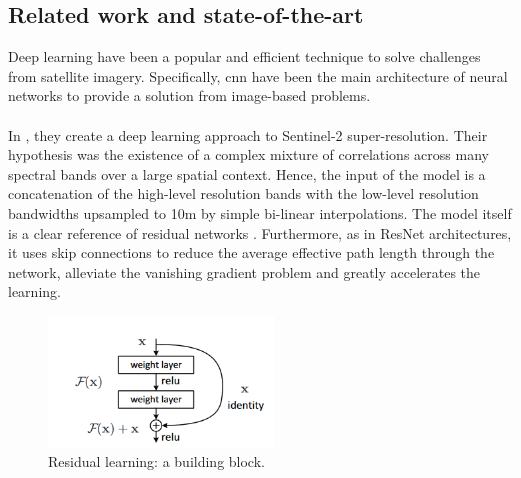 \documentclass[11pt, a4paper]{article}
\begin{document}
	\subsection{Related work and state-of-the-art}
	Deep learning have been a popular and efficient technique to solve challenges from satellite imagery. Specifically, \gls{cnn} have been the main architecture of neural networks to provide a solution from image-based problems. 
	\\
	\\
	In \cite{LANARAS2018305}, they create a deep learning approach to Sentinel-2 super-resolution. Their hypothesis was the existence of a complex mixture of correlations across many spectral bands over a large spatial context. Hence, the input of the model is a concatenation of the high-level resolution bands with the low-level resolution bandwidths upsampled to 10m by simple bi-linear interpolations. The model itself is a clear reference of residual networks \cite{he2016deep}. Furthermore, as in ResNet architectures, it uses skip connections to reduce the average effective path length through the network, alleviate the vanishing gradient problem and greatly accelerates the learning.
	\begin{figure}[H]
		\centering
		\includegraphics[width=6cm]{imgs/relatedwork/residualblock.png}
		\caption{Residual learning: a building block.}
	\end{figure}
\end{document}
